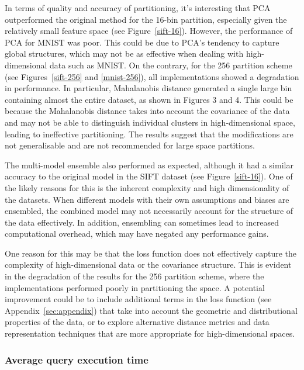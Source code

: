 \documentclass[sigconf, nonacm]{acmart}
\begin{document}
In terms of quality and accuracy of partitioning, it's interesting that PCA outperformed the original method for the 16-bin partition, especially given the relatively small feature space (see Figure~\ref{sift-16}). However, the performance of PCA for MNIST was poor. This could be due to PCA's tendency to capture global structures, which may not be as effective when dealing with high-dimensional data such as MNIST. On the contrary, for the 256 partition scheme (see Figures~\ref{sift-256} and \ref{mnist-256}), all implementations showed a degradation in performance. In particular, Mahalanobis distance generated a single large bin containing almost the entire dataset, as shown in Figures 3 and 4. This could be because the Mahalanobis distance takes into account the covariance of the data and may not be able to distinguish individual clusters in high-dimensional space, leading to ineffective partitioning. The results suggest that the modifications are not generalisable and are not recommended for large space partitions.

The multi-model ensemble also performed as expected, although it had a similar accuracy to the original model in the SIFT dataset (see Figure~\ref{sift-16}).  One of the likely reasons for this is the inherent complexity and high dimensionality of the datasets. When different models with their own assumptions and biases are ensembled, the combined model may not necessarily account for the structure of the data effectively. In addition, ensembling can sometimes lead to increased computational overhead, which may have negated any performance gains.

One reason for this may be that the loss function does not effectively capture the complexity of high-dimensional data or the covariance structure. This is evident in the degradation of the results for the 256 partition scheme, where the implementations performed poorly in partitioning the space. A potential improvement could be to include additional terms in the loss function (see Appendix~\ref{sec:appendix}) that take into account the geometric and distributional properties of the data, or to explore alternative distance metrics and data representation techniques that are more appropriate for high-dimensional spaces.

\subsubsection{Average query execution time}
\end{document}
